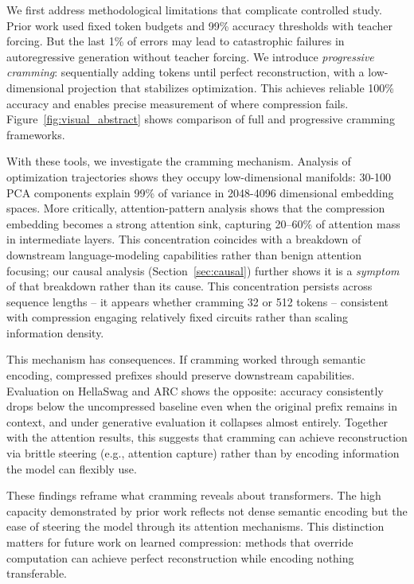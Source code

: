 \documentclass{article}
\theoremstyle{plain}
\theoremstyle{definition}
\theoremstyle{remark}
\begin{document}
We first address methodological limitations that complicate controlled study.
Prior work used fixed token budgets and 99\% accuracy thresholds with teacher forcing. But the last 1\% of errors may lead to catastrophic failures in autoregressive generation without teacher forcing.
We introduce \emph{progressive cramming}: sequentially adding tokens until perfect reconstruction, with a low-dimensional projection that stabilizes optimization.
This achieves reliable 100\% accuracy and enables precise measurement of where compression fails. Figure~\ref{fig:visual_abstract} shows comparison of full and progressive cramming frameworks.

With these tools, we investigate the cramming mechanism.
Analysis of optimization trajectories shows they occupy low-dimensional manifolds: 30-100 PCA components explain 99\% of variance in 2048-4096 dimensional embedding spaces.
More critically, attention-pattern analysis shows that the compression embedding becomes a strong attention sink, capturing 20--60\% of attention mass in intermediate layers.
This concentration coincides with a breakdown of downstream language-modeling capabilities rather than benign attention focusing; our causal analysis (Section~\ref{sec:causal}) further shows it is a \emph{symptom} of that breakdown rather than its cause.
This concentration persists across sequence lengths -- it appears whether cramming 32 or 512 tokens -- consistent with compression engaging relatively fixed circuits rather than scaling information density.

This mechanism has consequences.
If cramming worked through semantic encoding, compressed prefixes should preserve downstream capabilities.
Evaluation on HellaSwag and ARC shows the opposite: accuracy consistently drops below the uncompressed baseline even when the original prefix remains in context, and under generative evaluation it collapses almost entirely.
Together with the attention results, this suggests that cramming can achieve reconstruction via brittle steering (e.g., attention capture) rather than by encoding information the model can flexibly use.

These findings reframe what cramming reveals about transformers.
The high capacity demonstrated by prior work reflects not dense semantic encoding but the ease of steering the model through its attention mechanisms.
This distinction matters for future work on learned compression: methods that override computation can achieve perfect reconstruction while encoding nothing transferable.
\end{document}
